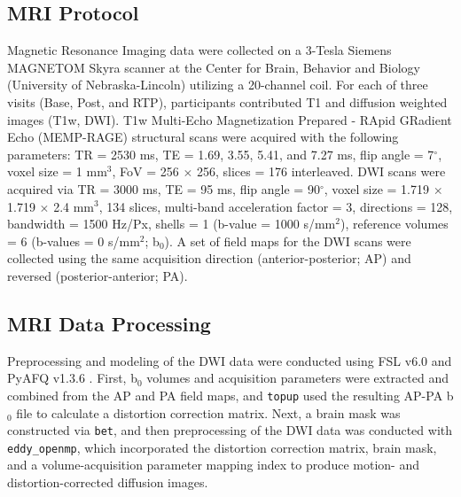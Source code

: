 \documentclass[]{imag-ms-template}
\begin{document}


\subsection{MRI Protocol}
\label{ssec:meth-mri}
Magnetic Resonance Imaging data were collected on a 3-Tesla Siemens MAGNETOM Skyra scanner at the Center for Brain, Behavior and Biology (University of Nebraska-Lincoln) utilizing a 20-channel coil. For each of three visits (Base, Post, and RTP), participants contributed T1 and diffusion weighted images (T1w, DWI). T1w Multi-Echo Magnetization Prepared - RApid GRadient Echo (MEMP-RAGE) structural scans were acquired with the following parameters: TR = 2530 ms, TE = 1.69, 3.55, 5.41, and 7.27 ms, flip angle = 7$^{\circ}$, voxel size = 1 mm$^3$, FoV = 256 $\times$ 256, slices = 176 interleaved. DWI scans were acquired via TR = 3000 ms, TE = 95 ms, flip angle = 90$^{\circ}$, voxel size = 1.719 $\times$ 1.719 $\times$ 2.4 mm$^3$, 134 slices, multi-band acceleration factor = 3, directions = 128, bandwidth = 1500 Hz/Px, shells = 1 (b-value = 1000 s/mm$^2$), reference volumes = 6 (b-values = 0 s/mm$^2$; b$_0$). A set of field maps for the DWI scans were collected using the same acquisition direction (anterior-posterior; AP) and reversed (posterior-anterior; PA).


\subsection{MRI Data Processing}
\label{ssec:meth-mri-proc}
Preprocessing and modeling of the DWI data were conducted using FSL v6.0 \parencite{jenkinson2012Fsl} and PyAFQ v1.3.6 \parencite{kruper2021EvaluatingReliabilityHuman,yeatman2012TractProfilesWhite}. First, b$_0$ volumes and acquisition parameters were extracted and combined from the AP and PA field maps, and \lstinline{topup} used the resulting AP-PA b$_0$ file to calculate a distortion correction matrix. Next, a brain mask was constructed via \lstinline{bet}, and then preprocessing of the DWI data was conducted with \lstinline{eddy_openmp}, which incorporated the distortion correction matrix, brain mask, and a volume-acquisition parameter mapping index to produce motion- and distortion-corrected diffusion images.
\end{document}
